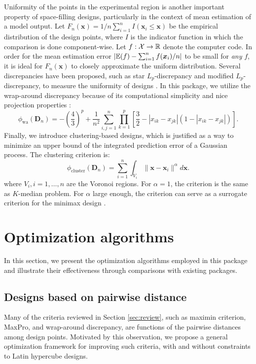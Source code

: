 Uniformity of the points in the experimental region is another important property of space-filling designs, particularly in the context of mean estimation of a model output. Let $F_n(\bm{x}) = 1/n \sum_{i=1}^n I(\bm{x}_i\leq\bm{x})$ be the empirical distribution of the design points, where $I$ is the indicator function in which the comparison is done component-wise. Let $f:\mathcal{X}\to \mathbb R$ denote the computer code. In order for the mean estimation error $|\mathbb E(f)- \sum_{i=1}^{n}f(\bm{x}_i)/n|$ to be small for \emph{any} $f$, it is ideal for $F_n(\bm{x})$ to closely approximate the uniform distribution. Several discrepancies have been proposed, such as star $L_p$-discrepancy and modified $L_p$-discrepancy, to measure the uniformity of designs \citep{fang2000uniform}. In this package, we utilize the wrap-around discrepancy because of its computational simplicity and nice projection properties \citep{hickernell1998generalized}:
\begin{equation}\label{eq:wa}
    \phi_{\text{wa}}(\bm{D}_n) = -\left(\frac{4}{3}\right)^p + \frac{1}{n^2}\sum_{i,j=1}^n\prod_{k=1}^p\left[\frac{3}{2} - |x_{ik}-x_{jk}|(1-|x_{ik}-x_{jk}|)\right].
\end{equation}
Finally, we introduce clustering-based designs, which is justified as a way to minimize an upper bound of the integrated prediction error of a Gaussian process. The clustering criterion is:
\begin{equation}\label{eq:cluster}
    \phi_{\text{cluster}}(\bm{D}_n) = \sum_{i=1}^n \int_{V_i}\|\bm{x}-\bm{x}_i\|^{\alpha}d\bm{x}.
\end{equation}
where $V_i, i=1,\dots,n$ are the Voronoi regions. For $\alpha=1$, the criterion is the same as $K$-median problem. For $\alpha$ large enough, the criterion can serve as a surrogate criterion for the minimax design \citep{mak2018minimax}.

\section{Optimization algorithms}
In this section, we present the optimization algorithms employed in this package and illustrate their effectiveness through comparisons with existing packages.

\subsection{Designs based on pairwise distance}
Many of the criteria reviewed in Section \ref{sec:review}, such as maximin criterion, MaxPro, and wrap-around discrepancy, are functions of the pairwise distances among design points. Motivated by this observation, we propose a general optimization framework for improving such criteria, with and without constraints to Latin hypercube designs. 

